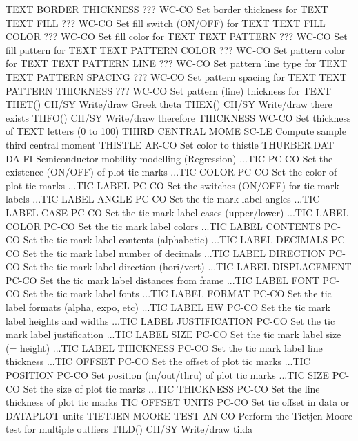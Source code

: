 TEXT BORDER THICKNESS  ???  WC-CO Set border thickness for TEXT
TEXT FILL              ???  WC-CO Set fill switch (ON/OFF) for TEXT
TEXT FILL COLOR        ???  WC-CO Set fill color for TEXT
TEXT PATTERN           ???  WC-CO Set fill pattern for TEXT
TEXT PATTERN COLOR     ???  WC-CO Set pattern color for TEXT
TEXT PATTERN LINE      ???  WC-CO Set pattern line type for TEXT
TEXT PATTERN SPACING   ???  WC-CO Set pattern spacing for TEXT
TEXT PATTERN THICKNESS ???  WC-CO Set pattern (line) thickness for TEXT
THET()                      CH/SY Write/draw Greek theta
THEX()                      CH/SY Write/draw there exists
THFO()                      CH/SY Write/draw therefore
THICKNESS                   WC-CO Set thickness of TEXT letters (0 to 100)
THIRD CENTRAL MOME          SC-LE Compute sample third central moment
THISTLE                     AR-CO Set color to thistle
THURBER.DAT                 DA-FI Semiconductor mobility modelling (Regression)
...TIC                      PC-CO Set the existence (ON/OFF) of plot tic marks
...TIC COLOR                PC-CO Set the color of plot tic marks
...TIC LABEL                PC-CO Set the switches (ON/OFF) for tic mark labels
...TIC LABEL ANGLE          PC-CO Set the tic mark label angles
...TIC LABEL CASE           PC-CO Set the tic mark label cases (upper/lower)
...TIC LABEL COLOR          PC-CO Set the tic mark label colors
...TIC LABEL CONTENTS       PC-CO Set the tic mark label contents (alphabetic)
...TIC LABEL DECIMALS       PC-CO Set the tic mark label number of decimals
...TIC LABEL DIRECTION      PC-CO Set the tic mark label direction (hori/vert)
...TIC LABEL DISPLACEMENT   PC-CO Set the tic mark label distances from frame
...TIC LABEL FONT           PC-CO Set the tic mark label fonts
...TIC LABEL FORMAT         PC-CO Set the tic label formats (alpha, expo, etc)
...TIC LABEL HW             PC-CO Set the tic mark label heights and widths
...TIC LABEL JUSTIFICATION  PC-CO Set the tic mark label justification
...TIC LABEL SIZE           PC-CO Set the tic mark label size (= height)
...TIC LABEL THICKNESS      PC-CO Set the tic mark label line thickness
...TIC OFFSET               PC-CO Set the offset of plot tic marks
...TIC POSITION             PC-CO Set position (in/out/thru) of plot tic marks
...TIC SIZE                 PC-CO Set the size of plot tic marks
...TIC THICKNESS            PC-CO Set the line thickness of plot tic marks
TIC OFFSET UNITS            PC-CO Set tic offset in data or DATAPLOT units
TIETJEN-MOORE TEST          AN-CO Perform the Tietjen-Moore test for multiple outliers
TILD()                      CH/SY Write/draw tilda
